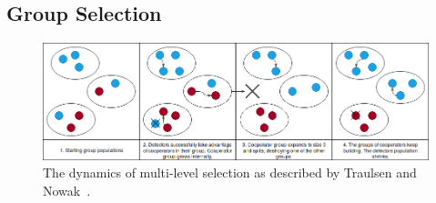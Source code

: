 \documentclass[]{final_report}
\begin{document}
\subsection{Group Selection}
\label{appendix:groupselection}
\begin{figure}
	\center
	\includegraphics[width=\textwidth]{GroupSelection.png}
	\caption{The dynamics of multi-level selection as described by Traulsen and Nowak~\cite{multilevel_nowak}.}
	\label{fig:group}
\end{figure}
\end{document}
